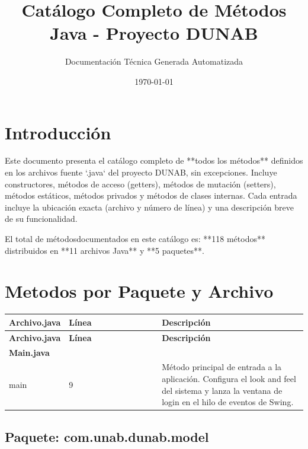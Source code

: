 \documentclass[utf8]{article}
\title{Catálogo Completo de Métodos Java - Proyecto DUNAB}
\author{Documentación Técnica Generada Automatizada}
\date{\today}
\begin{document}
\maketitle

\section*{Introducción}
Este documento presenta el catálogo completo de **todos los métodos** definidos en los archivos fuente `.java` del proyecto DUNAB, sin excepciones. Incluye constructores, métodos de acceso (getters), métodos de mutación (setters), métodos estáticos, métodos privados y métodos de clases internas. Cada entrada incluye la ubicación exacta (archivo y número de línea) y una descripción breve de su funcionalidad.

El total de métodosdocumentados en este catálogo es: **118 métodos** distribuidos en **11 archivos Java** y **5 paquetes**.

\section*{Metodos por Paquete y Archivo}

\begin{longtable}{p{0.18\linewidth}p{0.32\linewidth}p{0.5\linewidth}}
\hline
\textbf{Archivo.java} & \textbf{Línea} & \textbf{Descripción} \\ \hline
\endfirsthead
\hline
\textbf{Archivo.java} & \textbf{Línea} & \textbf{Descripción} \\ \hline
\endhead
\hline
\endfoot
\hline
\endlastfoot
\endlastfoot
\textbf{Main.java} & & \\ \hline
main & 9 & Método principal de entrada a la aplicación. Configura el look and feel del sistema y lanza la ventana de login en el hilo de eventos de Swing. \\ \hline
\end{longtable}

\subsection*{Paquete: com.unab.dunab.model}
\end{document}
